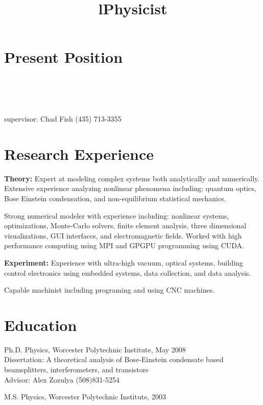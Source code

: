\documentclass[overlapped,line,letterpaper]{res}
\begin{document}
\begin{resume}
\section{\bf Present Position}

\begin{format}
\title{l}\\
\\
\body\\
\end{format}



\title{Physicist}

\begin{position}
supervisor: Chad Fish \hfill (435) 713-3355
 \end{position}



\section{\bf Research Experience}

 {\bf Theory:} Expert at modeling complex systems both analytically and numerically.  
Extensive experience analyzing nonlinear phenomena including: quantum optics, Bose Einstein condensation, and non-equilibrium statistical mechanics.  

Strong numerical modeler with experience including: nonlinear systems, optimizations, Monte-Carlo solvers, finite element analysis, three dimensional visualizations, GUI interfaces, and electromagnetic fields.  Worked with high performance computing using MPI and GPGPU programming using CUDA. 

 {\bf Experiment:} Experience with ultra-high vacuum, optical systems, building control electronics using embedded systems, data collection,  and data analysis.  

Capable machinist including programing and using CNC machines.



\section{\bf Education}
Ph.D. Physics, Worcester Polytechnic Institute, May 2008 \\
Dissertation: A theoretical analysis of Bose-Einstein condensate based beamsplitters, interferometers, and transistors \\
Advisor: Alex Zozulya \hfill (508)831-5254

M.S. Physics, Worcester Polytechnic Institute, 2003



\end{resume}
\end{document}
